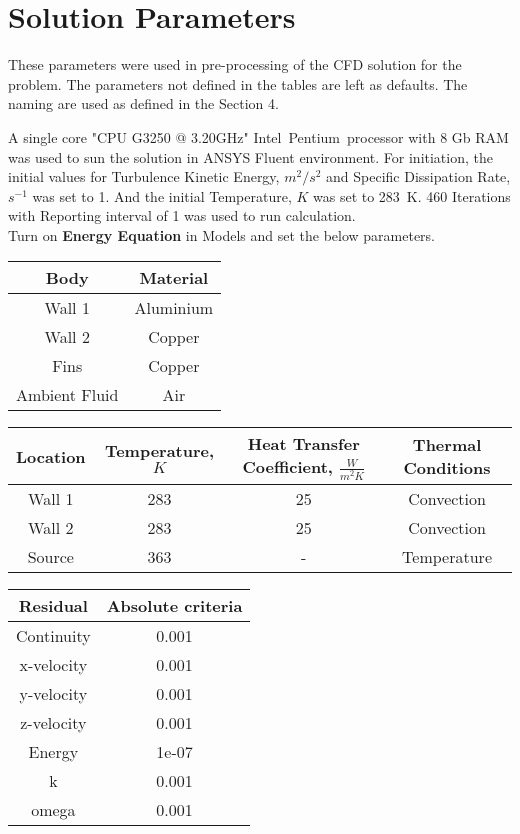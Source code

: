 \documentclass[twoside]{article}
\begin{document}
\section{Solution Parameters}
\vspace{0.5cm}
These parameters were used in pre-processing of the CFD solution for the problem. The parameters not defined in the tables are left as defaults. The naming are used as defined in the Section 4. 

A single core "CPU G3250 @ 3.20GHz" Intel\textregistered\  Pentium\textregistered\ processor with 8 Gb RAM was used to sun the solution in ANSYS Fluent environment. 
For initiation, the initial values for Turbulence Kinetic Energy, $m^2/s^2$ and Specific Dissipation Rate, $s^{-1}$ was set to 1. And the initial Temperature, $K$ was set to \SI{283}{\kelvin}.
460 Iterations with Reporting interval of 1 was used to run calculation. 
\vspace{0.75cm}\\
Turn on \textbf{Energy Equation} in Models and set the below parameters.
\vspace{1cm}
\begin{center}
\begin{tabular}{c c}
\hline
     Body & Material \\
     \hline
     Wall 1 & Aluminium  \\
     Wall 2 & Copper \\
     Fins & Copper \\
     Ambient Fluid & Air \\
     \hline
\end{tabular} 
\vspace{2cm}
\end{center}
\begin{center}
\begin{tabular}{c c c c}
\hline
     Location & Temperature, $K$ & Heat Transfer Coefficient, $\frac{W}{m^2K}$ & Thermal Conditions\\
     \hline
     Wall 1 & 283 & 25 & Convection\\
     Wall 2 & 283 & 25 & Convection\\
     Source & 363 & - & Temperature\\
     \hline
\end{tabular} 
\end{center}
\vspace{2cm}
\begin{center}
\begin{tabular}{c c}
\hline
     Residual & Absolute criteria\\
     \hline
     Continuity & 0.001\\
     x-velocity & 0.001\\
     y-velocity & 0.001\\
     z-velocity & 0.001\\
     Energy & 1e-07\\
     k & 0.001\\
     omega & 0.001\\
     \hline
\end{tabular} 
\end{center}
\end{document}
